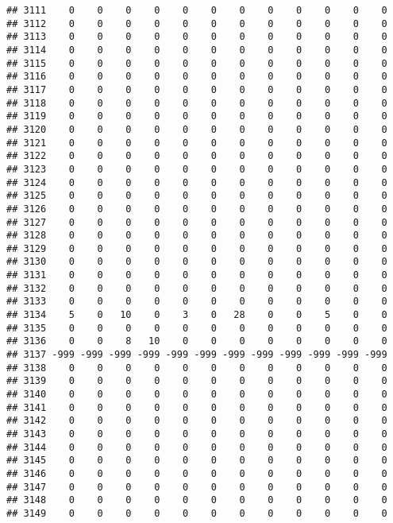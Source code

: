 \documentclass[]{article}
\begin{document}
\begin{verbatim}
## 3111    0    0    0    0    0    0    0    0    0    0    0    0
## 3112    0    0    0    0    0    0    0    0    0    0    0    0
## 3113    0    0    0    0    0    0    0    0    0    0    0    0
## 3114    0    0    0    0    0    0    0    0    0    0    0    0
## 3115    0    0    0    0    0    0    0    0    0    0    0    0
## 3116    0    0    0    0    0    0    0    0    0    0    0    0
## 3117    0    0    0    0    0    0    0    0    0    0    0    0
## 3118    0    0    0    0    0    0    0    0    0    0    0    0
## 3119    0    0    0    0    0    0    0    0    0    0    0    0
## 3120    0    0    0    0    0    0    0    0    0    0    0    0
## 3121    0    0    0    0    0    0    0    0    0    0    0    0
## 3122    0    0    0    0    0    0    0    0    0    0    0    0
## 3123    0    0    0    0    0    0    0    0    0    0    0    0
## 3124    0    0    0    0    0    0    0    0    0    0    0    0
## 3125    0    0    0    0    0    0    0    0    0    0    0    0
## 3126    0    0    0    0    0    0    0    0    0    0    0    0
## 3127    0    0    0    0    0    0    0    0    0    0    0    0
## 3128    0    0    0    0    0    0    0    0    0    0    0    0
## 3129    0    0    0    0    0    0    0    0    0    0    0    0
## 3130    0    0    0    0    0    0    0    0    0    0    0    0
## 3131    0    0    0    0    0    0    0    0    0    0    0    0
## 3132    0    0    0    0    0    0    0    0    0    0    0    0
## 3133    0    0    0    0    0    0    0    0    0    0    0    0
## 3134    5    0   10    0    3    0   28    0    0    5    0    0
## 3135    0    0    0    0    0    0    0    0    0    0    0    0
## 3136    0    0    8   10    0    0    0    0    0    0    0    0
## 3137 -999 -999 -999 -999 -999 -999 -999 -999 -999 -999 -999 -999
## 3138    0    0    0    0    0    0    0    0    0    0    0    0
## 3139    0    0    0    0    0    0    0    0    0    0    0    0
## 3140    0    0    0    0    0    0    0    0    0    0    0    0
## 3141    0    0    0    0    0    0    0    0    0    0    0    0
## 3142    0    0    0    0    0    0    0    0    0    0    0    0
## 3143    0    0    0    0    0    0    0    0    0    0    0    0
## 3144    0    0    0    0    0    0    0    0    0    0    0    0
## 3145    0    0    0    0    0    0    0    0    0    0    0    0
## 3146    0    0    0    0    0    0    0    0    0    0    0    0
## 3147    0    0    0    0    0    0    0    0    0    0    0    0
## 3148    0    0    0    0    0    0    0    0    0    0    0    0
## 3149    0    0    0    0    0    0    0    0    0    0    0    0

\end{verbatim}
\end{document}
